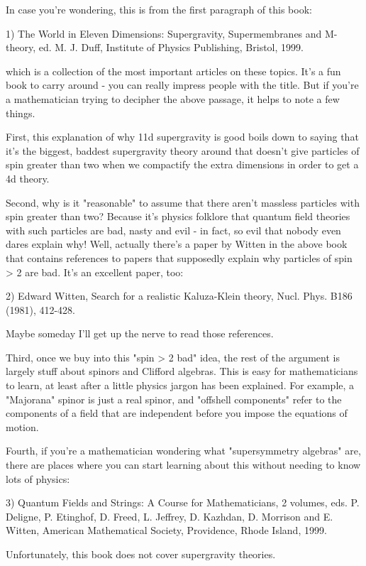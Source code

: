 In case you're wondering, this is from the first paragraph of this book: 
 
1) The World in Eleven Dimensions: Supergravity, Supermembranes and 
M-theory, ed. M. J. Duff, Institute of Physics Publishing, Bristol, 
1999. 
 
which is a collection of the most important articles on these topics. 
It's a fun book to carry around - you can really impress people with the 
title.  But if you're a mathematician trying to decipher the above 
passage, it helps to note a few things. 
 
First, this explanation of why 11d supergravity is good boils down to 
saying that it's the biggest, baddest supergravity theory around that 
doesn't give particles of spin greater than two when we compactify the 
extra dimensions in order to get a 4d theory.   
 
Second, why is it "reasonable" to assume that there aren't massless 
particles with spin greater than two?  Because it's physics folklore 
that quantum field theories with such particles are bad, nasty and evil 
- in fact, so evil that nobody even dares explain why!  Well, actually 
there's a paper by Witten in the above book that contains references to 
papers that supposedly explain why particles of spin > 2 are bad.  It's  
an excellent paper, too: 
 
2) Edward Witten, Search for a realistic Kaluza-Klein theory, Nucl. 
Phys. B186 (1981), 412-428. 
 
Maybe someday I'll get up the nerve to read those references. 
 
Third, once we buy into this "spin > 2 bad" idea, the rest
of the argument is largely stuff about spinors and Clifford algebras.
This is easy for mathematicians to learn, at least after a little
physics jargon has been explained.  For example, a "Majorana"
spinor is just a real spinor, and "offshell components" refer
to the components of a field that are independent before you impose the
equations of motion.
 
Fourth, if you're a mathematician wondering what "supersymmetry  
algebras" are, there are places where you can start learning about 
this without needing to know lots of physics: 
 
3) Quantum Fields and Strings: A Course for Mathematicians, 2 volumes,
eds. P. Deligne, P. Etinghof, D. Freed, L. Jeffrey, D. Kazhdan, D. Morrison 
and E. Witten, American Mathematical Society, Providence, Rhode Island,
1999.
 
Unfortunately, this book does not cover supergravity theories. 
 
